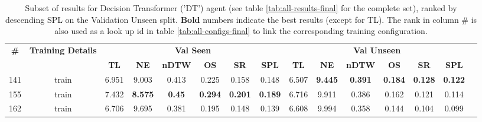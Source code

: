 \begin{table}
\centering
\caption{\label{tab:dt_normalized_visual_features}Subset of results for Decision Transformer ('DT') agent (see table \ref{tab:all-results-final} for the complete set), ranked by descending SPL on the Validation Unseen split. \textbf{Bold} numbers indicate the best results (except for TL). The rank in column \# is also used as a look up id in table \ref{tab:all-configs-final} to link the corresponding training configuration.}
\begin{tabular}{@{\hskip3pt}c@{\hskip3pt}c@{\hskip3pt}c@{\hskip3pt}c@{\hskip3pt}c@{\hskip3pt}c@{\hskip3pt}c@{\hskip3pt}c@{\hskip3pt}c@{\hskip3pt}c@{\hskip3pt}c@{\hskip3pt}c@{\hskip3pt}c@{\hskip3pt}c@{\hskip3pt}c}
\toprule
                                  \textbf{\#} & \textbf{Training Details} & \multicolumn{6}{c}{\textbf{Val Seen}} & \multicolumn{6}{c}{\textbf{Val Unseen}} \\
\cmidrule(l){3-8}\cmidrule(l){9-14}\textbf{~} &                \textbf{~} &       \textbf{TL} &     \textbf{NE} &  \textbf{nDTW} &     \textbf{OS} &     \textbf{SR} &    \textbf{SPL} &         \textbf{TL} &     \textbf{NE} &   \textbf{nDTW} &     \textbf{OS} &     \textbf{SR} &    \textbf{SPL} \\
\midrule
                                          141 &                     train &             6.951 &           9.003 &          0.413 &           0.225 &           0.158 &           0.148 &               6.507 &  \textbf{9.445} &  \textbf{0.391} &  \textbf{0.184} &  \textbf{0.128} &  \textbf{0.122} \\
                                          155 &                     train &             7.432 &  \textbf{8.575} &  \textbf{0.45} &  \textbf{0.294} &  \textbf{0.201} &  \textbf{0.189} &               6.716 &           9.911 &           0.386 &           0.162 &           0.121 &           0.114 \\
                                          162 &                     train &             6.706 &           9.695 &          0.381 &           0.195 &           0.148 &           0.139 &               6.608 &           9.994 &           0.358 &           0.144 &           0.104 &           0.099 \\
\bottomrule
\end{tabular}
\end{table}
